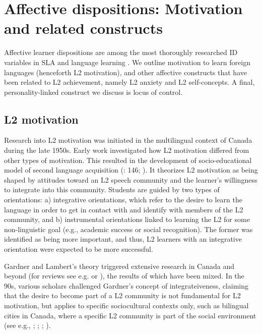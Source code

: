 \documentclass[output=paper]{langscibook}
\begin{document}
\section{Affective dispositions: Motivation and related constructs}

Affective learner dispositions are among the most thoroughly researched ID variables in SLA and language learning \citep[536]{Ellis2004}. We outline motivation to learn foreign languages (henceforth L2 motivation), and other affective constructs that have been related to L2 achievement, namely L2 anxiety and L2 self-concepts. A final, personality-linked construct we discuss is locus of control. 

\subsection{L2 motivation} %

Research into L2 motivation was initiated in the multilingual context of Canada during the late 1950s. Early work investigated how L2 motivation differed from other types of motivation. This resulted in the development of  socio-educational model of second language acquisition (\citealt{Gardner1985}: 146; \citealt{Gardner2000}). It theorizes L2 motivation as being shaped by attitudes toward an L2 speech community and the learner’s willingness to integrate into this community. Students are guided by two types of orientations: a) integrative orientations, which refer to the desire to learn the language in order to get in contact with and identify with members of the L2 community, and b) instrumental orientations linked to learning the L2 for some non-linguistic goal (e.g., academic success or social recognition). The former was identified as being more important, and thus, L2 learners with an integrative orientation were expected to be more successful.

Gardner and Lambert’s theory triggered extensive research in Canada and beyond (for reviews see e.g. \citealt{Gardner1985} or \citealt{Au1988}), the results of which have been mixed. In the 90s, various scholars challenged Gardner’s concept of integrateiveness, claiming that the desire to become part of a L2 community is not fundamental for L2 motivation, but applies to specific sociocultural contexts only, such as bilingual cities in Canada, where a specific L2 community is part of the social environment (see e.g., \citealt{NoelsClement1989}; \citealt{Doernyei1990}; \citealt{MoiseEtAl1990}; \citealt{ClémentEtAl1994}). 
\end{document}
